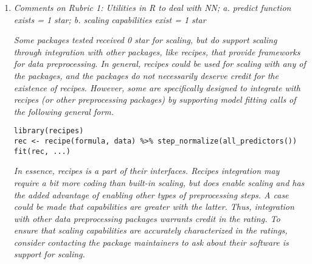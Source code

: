 \documentclass[12pt]{article}
\begin{document}
\begin{enumerate}


\item \textit{Comments on Rubric 1: Utilities in R to deal with NN; 
a. predict function exists = 1 star;
 b. scaling capabilities exist = 1 star}
 
\textit{Some packages tested received 0 star for scaling, but do support scaling through integration with other packages, like recipes, that provide frameworks for data preprocessing.  In general, recipes could be used for scaling with any of the packages, and the packages do not necessarily deserve credit for the existence of recipes.  However, some are specifically designed to integrate with recipes (or other preprocessing packages) by supporting model fitting calls of the following general form.
}
\begin{verbatim}
library(recipes)
rec <- recipe(formula, data) %>% step_normalize(all_predictors())
fit(rec, ...)
\end{verbatim}
\textit{In essence, recipes is a part of their interfaces.  Recipes integration may require a bit more coding than built-in scaling, but does enable scaling and has the added advantage of enabling other types of preprocessing steps.  A case could be made that capabilities are greater with the latter.  Thus, integration with other data preprocessing packages warrants credit in the rating.  To ensure that scaling capabilities are accurately characterized in the ratings, consider contacting the package maintainers to ask about their software is support for scaling.
}


\end{enumerate}
\end{document}
